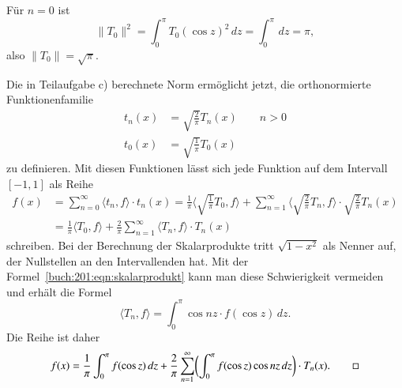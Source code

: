 \begin{loesung}
\begin{teilaufgaben}
Für $n=0$ ist
\[
\|T_0\|^2
=
\int_{0}^\pi T_0(\cos z)^2\,dz
=
\int_{0}^\pi \,dz
=
\pi,
\]
also $\|T_0\|=\sqrt{\pi}$.
\item
Die in Teilaufgabe c) berechnete Norm ermöglicht jetzt, die orthonormierte
Funktionenfamilie
\begin{align*}
t_n(x) &= \sqrt{\frac{2}{\pi}} T_n(x)\qquad n>0\\
t_0(x) &= \sqrt{\frac{1}{\pi}} T_0(x)
\end{align*}
zu definieren.
Mit diesen Funktionen lässt sich jede Funktion auf dem Intervall $[-1,1]$
als Reihe
\begin{align*}
f(x)
&=
\sum_{n=0}^\infty
\langle t_n,f\rangle \cdot t_n(x)
=
\frac{1}{\pi}
\biggl\langle \sqrt{\frac{1}{\pi}} T_0,f\biggr\rangle
+
\sum_{n=1}^\infty
\biggl\langle \sqrt{\frac{2}{\pi}} T_n,f\biggr\rangle
\cdot
\sqrt{\frac{2}{\pi}}
T_n(x)
\\
&=
\frac{1}{\pi}
\langle T_0,f\rangle
+
\frac{2}{\pi}
\sum_{n=1}^\infty
\langle T_n,f\rangle \cdot T_n(x)
\end{align*}
schreiben.
Bei der Berechnung der Skalarprodukte tritt $\sqrt{1-x^2}$ als Nenner
auf, der Nullstellen an den Intervallenden hat.
Mit der Formel~\eqref{buch:201:eqn:skalarprodukt} kann man diese 
Schwierigkeit vermeiden und erhält die Formel
\[
\langle T_n,f\rangle
=
\int_0^\pi \cos nz \cdot f(\cos z)\,dz.
\]
Die Reihe ist daher
\[
f(x)
=
\frac{1}{\pi}
\int_0^\pi f(\cos z)\,dz
+
\frac{2}{\pi}
\sum_{n=1}^\infty
\biggl(
\int_0^\pi f(\cos z)\cos nz \,dz
\biggr)
\cdot
T_n(x).
\qedhere
\]
\end{teilaufgaben}
\end{loesung}


